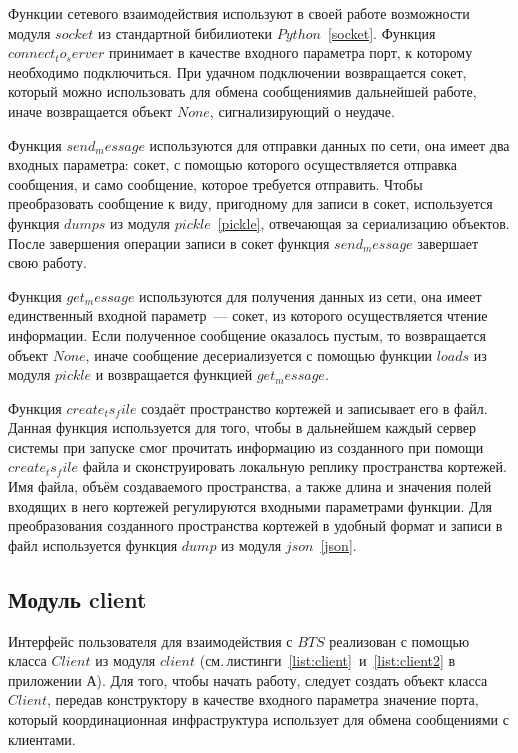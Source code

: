 Функции сетевого взаимодействия используют в своей работе возможности модуля $socket$ из стандартной бибилиотеки $Python$~\ref{socket}. Функция $connect_to_server$ принимает в качестве входного параметра порт, к которому необходимо подключиться. При удачном подключении возвращается сокет, который можно использовать для обмена сообщениямив дальнейшей работе, иначе возвращается объект $None$, сигнализирующий о неудаче.

Функция $send_message$ используются для отправки данных по сети, она имеет два входных параметра: сокет, с помощью которого осуществляется отправка сообщения, и само сообщение, которое требуется отправить. Чтобы преобразовать сообщение к виду, пригодному для записи в сокет, используется функция $dumps$ из модуля $pickle$~\ref{pickle}, отвечающая за сериализацию объектов. После завершения операции записи в сокет функция $send_message$ завершает свою работу.

Функция $get_message$ используются для получения данных из сети, она имеет единственный входной параметр~--- сокет, из которого осуществляется чтение информации. Если полученное сообщение оказалось пустым, то возвращается объект $None$, иначе сообщение десериализуется с помощью функции $loads$ из модуля $pickle$ и возвращается функцией $get_message$.

Функция $create_ts_file$ создаёт пространство кортежей и записывает его в файл. Данная функция используется для того, чтобы в дальнейшем каждый сервер системы при запуске смог прочитать информацию из созданного при помощи  $create_ts_file$ файла и сконструировать локальную реплику пространства кортежей. Имя файла, объём создаваемого пространства, а также длина и значения полей входящих в него кортежей регулируются входными параметрами функции. Для преобразования созданного пространства кортежей в удобный формат и записи в файл используется функция $dump$ из модуля $json$~\ref{json}.


\subsection{Модуль client}\label{subsec:3}
Интерфейс пользователя для взаимодействия с $BTS$ реализован с помощью класса $Client$ из модуля $client$ (см.\,листинги~\ref{list:client}~и~\ref{list:client2} в приложении А). Для того, чтобы начать работу, следует создать объект класса $Client$, передав конструктору в качестве входного параметра значение порта, который координационная инфраструктура использует для обмена сообщениями с клиентами.

